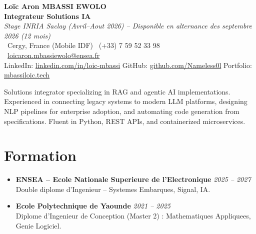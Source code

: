 \documentclass[a4paper,11pt]{article}
\begin{document}
\begin{center}
    {\Large \textbf{Lo\"ic Aron MBASSI EWOLO}} \\ \vspace{4pt}
    \textbf{\large Integrateur Solutions IA} \\
    \textit{\small Stage INRIA Saclay (Avril--Aout 2026) -- Disponible en alternance des septembre 2026 (12 mois)} \\ \vspace{4pt}
    \small
    \Pointinghand\ Cergy, France (Mobile IDF) \quad
    \Mobilefone\ (+33) 7 59 52 33 98 \quad
    {\color{primary}\Letter\ \href{mailto:loicaron.mbassiewolo@ensea.fr}{loicaron.mbassiewolo@ensea.fr}} \\ \vspace{2pt}
    {\color{primary}LinkedIn: \href{https://www.linkedin.com/in/loic-mbassi/}{linkedin.com/in/loic-mbassi}} \quad
    {\color{primary}GitHub: \href{https://github.com/Nameless0l}{github.com/Nameless0l}} \quad
    {\color{primary}Portfolio: \href{https://mbassiloic.tech}{mbassiloic.tech}}
\end{center}

\vspace{-6pt}

\noindent\small{Solutions integrator specializing in RAG and agentic AI implementations. Experienced in connecting legacy systems to modern LLM platforms, designing NLP pipelines for enterprise adoption, and automating code generation from specifications. Fluent in Python, REST APIs, and containerized microservices.}

\section{Formation}
\begin{itemize}[leftmargin=*, label=\tiny$\bullet$, nosep]
    \item \textbf{ENSEA -- Ecole Nationale Superieure de l'Electronique} \hfill \textit{2025 -- 2027} \\
    \small{Double diplome d'Ingenieur -- Systemes Embarques, Signal, IA.}
    \item \textbf{Ecole Polytechnique de Yaounde} \hfill \textit{2021 -- 2025} \\
    \small{Diplome d'Ingenieur de Conception (Master 2) : Mathematiques Appliquees, Genie Logiciel.}
\end{itemize}
\end{document}
